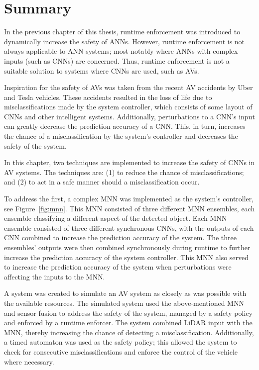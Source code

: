 \section{Summary}
In the previous chapter of this thesis, runtime enforcement was introduced to dynamically increase the safety of \acfp{ANN}.
However, runtime enforcement is not always applicable to \ac{ANN} systems; most notably where \acp{ANN} with complex inputs (such as \acfp{CNN}) are concerned.
Thus, runtime enforcement is not a suitable solution to systems where \acp{CNN} are used, such as \acfp{AV}.

Inspiration for the safety of \acp{AV} was taken from the recent \ac{AV} accidents by Uber and Tesla vehicles.
These accidents resulted in the loss of life due to misclassifications made by the system controller, which consists of some layout of \acp{CNN} and other intelligent systems.
Additionally, perturbations to a \ac{CNN}'s input can greatly decrease the prediction accuracy of a \ac{CNN}.
This, in turn, increases the chance of a misclassification by the system's controller and decreases the safety of the system.

In this chapter, two techniques are implemented to increase the safety of \acfp{CNN} in \acf{AV} systems.
The techniques are: (1) to reduce the chance of misclassifications; and (2) to act in a safe manner should a misclassification occur.

To address the first, a complex \acf{MNN} was implemented as the system's controller, see Figure~\ref{fig:mnn}.
This \ac{MNN} consisted of three different \ac{MNN} ensembles, each ensemble classifying a different aspect of the detected object.
Each \ac{MNN} ensemble consisted of three different synchronous \acp{CNN}, with the outputs of each \ac{CNN} combined to increase the prediction accuracy of the system.
The three ensembles' outputs were then combined synchronously during runtime to further increase the prediction accuracy of the system controller.
This \ac{MNN} also served to increase the prediction accuracy of the system when perturbations were affecting the inputs to the \ac{MNN}.

A system was created to simulate an \ac{AV} system as closely as was possible with the available resources.
The simulated system used the above-mentioned \ac{MNN} and sensor fusion to address the safety of the system, managed by a safety policy and enforced by a runtime enforcer.
The system combined \acf{LiDAR} input with the \ac{MNN}, thereby increasing the chance of detecting a misclassification.
Additionally, a timed automaton was used as the safety policy; this allowed the system to check for consecutive misclassifications and enforce the control of the vehicle where necessary.

